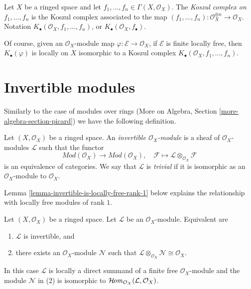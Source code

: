 \begin{definition}
\label{definition-koszul-complex}
Let $X$ be a ringed space and let
$f_1, \ldots, f_n \in \Gamma(X, \mathcal{O}_X)$. The
{\it Koszul complex on $f_1, \ldots, f_n$} is the Koszul complex
associated to the map
$(f_1, \ldots, f_n) : \mathcal{O}_X^{\oplus n} \to \mathcal{O}_X$.
Notation $K_\bullet(\mathcal{O}_X, f_1, \ldots, f_n)$,
or $K_\bullet(\mathcal{O}_X, f_\bullet)$.
\end{definition}

\noindent
Of course, given an $\mathcal{O}_X$-module map
$\varphi : \mathcal{E} \to \mathcal{O}_X$,
if $\mathcal{E}$ is finite locally free, then
$K_\bullet(\varphi)$ is locally on $X$ isomorphic to a Koszul complex
$K_\bullet(\mathcal{O}_X, f_1, \ldots, f_n)$.



\section{Invertible modules}
\label{section-invertible}

\noindent
Similarly to the case of modules over rings
(More on Algebra, Section \ref{more-algebra-section-picard})
we have the following definition.

\begin{definition}
\label{definition-invertible}
Let $(X, \mathcal{O}_X)$ be a ringed space. An
{\it invertible $\mathcal{O}_X$-module} is a sheaf
of $\mathcal{O}_X$-modules $\mathcal{L}$ such that
the functor
$$
\textit{Mod}(\mathcal{O}_X) \longrightarrow \textit{Mod}(\mathcal{O}_X),\quad
\mathcal{F} \longmapsto \mathcal{L} \otimes_{\mathcal{O}_X} \mathcal{F}
$$
is an equivalence of categories. We say that $\mathcal{L}$ is
{\it trivial} if it is isomorphic as an $\mathcal{O}_X$-module
to $\mathcal{O}_X$.
\end{definition}

\noindent
Lemma \ref{lemma-invertible-is-locally-free-rank-1}
below explains the relationship with locally free modules
of rank $1$.

\begin{lemma}
\label{lemma-invertible}
Let $(X, \mathcal{O}_X)$ be a ringed space. Let $\mathcal{L}$
be an $\mathcal{O}_X$-module. Equivalent are
\begin{enumerate}
\item $\mathcal{L}$ is invertible, and
\item there exists an $\mathcal{O}_X$-module $\mathcal{N}$
such that
$\mathcal{L} \otimes_{\mathcal{O}_X} \mathcal{N} \cong \mathcal{O}_X$.
\end{enumerate}
In this case $\mathcal{L}$ is locally a direct summand of a finite free
$\mathcal{O}_X$-module and the module $\mathcal{N}$ in (2) is isomorphic to
$\mathop{\mathcal{H}\!\mathit{om}}\nolimits_{\mathcal{O}_X}(\mathcal{L}, \mathcal{O}_X)$.
\end{lemma}

